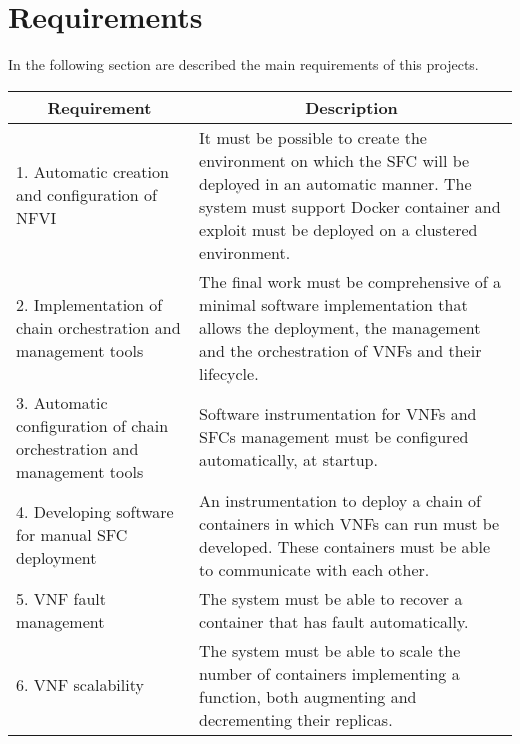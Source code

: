 \section{Requirements}\label{chap:prjan:sec:req}
In the following section are described the main requirements of this projects.

\begin{longtable}[c]{p{}p{}}
\hline
\multicolumn{1}{c}{\textbf{Requirement}}                                & \multicolumn{1}{c}{\textbf{Description}}                                                                                                                                                       \\ \hline
\endhead
%
\hline
\endfoot
%
\endlastfoot
%
1. Automatic creation and configuration of NFVI                         & It must be possible to create the environment on which the SFC will be deployed in an automatic manner. The system must support Docker container and exploit must be deployed on a clustered environment. \\
2. Implementation of chain orchestration and management tools           & The final work must be comprehensive of a minimal software implementation that allows the deployment, the management and the orchestration of VNFs and their lifecycle.                      \\
3. Automatic configuration of chain orchestration and management tools & Software instrumentation for VNFs and SFCs management must be configured automatically, at startup.                                                                                              \\
4. Developing software for manual SFC deployment                        & An instrumentation to deploy a chain of containers in which VNFs can run must be developed. These containers must be able to communicate with each other.                                                \\
5. VNF fault management                                                 & The system must be able to recover a container that has fault automatically.                                                                                                                      \\
6. VNF scalability                                                      & The system must be able to scale the number of containers implementing a function, both augmenting and decrementing their replicas.                                                               \\

\end{longtable}
